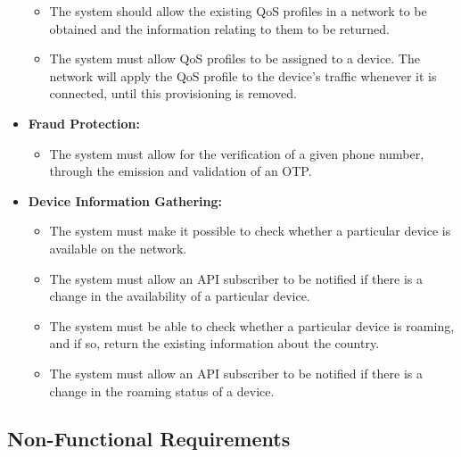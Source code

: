 \begin{itemize}
\begin{itemize}
      \item The system should allow the existing QoS profiles in a network to be
        obtained and the information relating to them to be returned.

      \item The system must allow QoS profiles to be assigned to a device. The
        network will apply the QoS profile to the device's traffic whenever it is
        connected, until this provisioning is removed.
    \end{itemize}

  \item \textbf{Fraud Protection:}
    \begin{itemize}
      \item The system must allow for the verification of a given phone number,
        through the emission and validation of an OTP.
    \end{itemize}

  \item \textbf{Device Information Gathering:}
    \begin{itemize}
      \item The system must make it possible to check whether a particular
        device is available on the network.

      \item The system must allow an API subscriber to be notified if there is
        a change in the availability of a particular device.

      \item The system must be able to check whether a particular device is
        roaming, and if so, return the existing information about the country.

      \item The system must allow an API subscriber to be notified if there is
        a change in the roaming status of a device.
    \end{itemize}
\end{itemize}

\subsection{Non-Functional Requirements}

